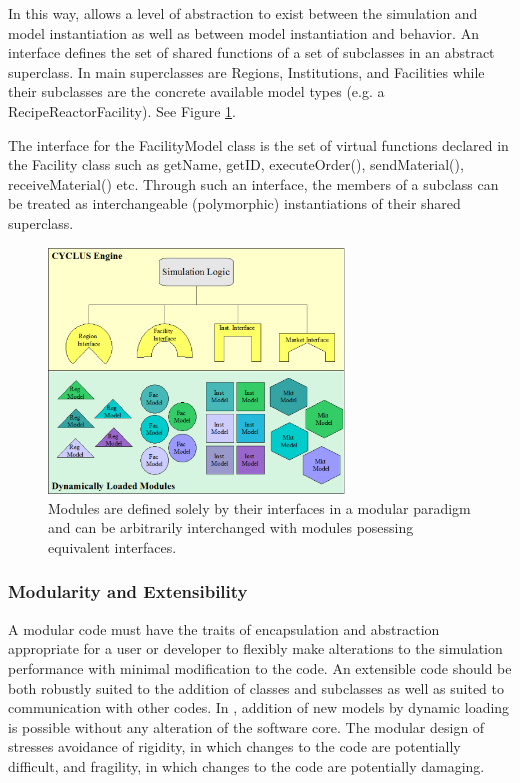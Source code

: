In this way, \Cyclus allows a level of abstraction to exist between 
the simulation and model instantiation as well as between model 
instantiation and behavior.  An interface defines the set of shared 
functions of a set of subclasses in an abstract superclass. In \Cyclus
main superclasses are Regions, Institutions, and Facilities 
while their subclasses are the concrete available model types (e.g. a 
RecipeReactorFacility). See Figure \ref{fig:modularity}.

The interface for the FacilityModel class is the set of 
virtual functions declared in the Facility class such as getName, 
getID, executeOrder(), sendMaterial(), receiveMaterial() etc.  Through 
such an interface, the members of a subclass can be treated as 
interchangeable (polymorphic) instantiations of their shared 
superclass. 

\begin{figure}[htb!]
  \begin{center}
    \includegraphics[width=0.7\textwidth]{./chapters/paradigm/modularity.png}
  \end{center}
  \caption[Module Interfaces and Encapsulation in \Cyclus.]{Modules are defined solely 
  by their interfaces in a modular paradigm and can be arbitrarily 
  interchanged with modules posessing equivalent interfaces.}
  \label{fig:modularity}
\end{figure}


\subsubsection{Modularity and Extensibility}

A modular code must have the traits of encapsulation and abstraction 
appropriate for a user or developer to flexibly make alterations to 
the simulation performance with minimal modification to the code. An 
extensible code should be both robustly suited to the addition of 
classes and subclasses as well as suited to communication with other codes.
In \Cyclus, addition of new models by dynamic loading is possible without 
any alteration of the software core. The modular design of \Cyclus stresses
avoidance of rigidity, in which changes to the code are potentially difficult, 
and fragility, in which changes to the code are potentially damaging.

